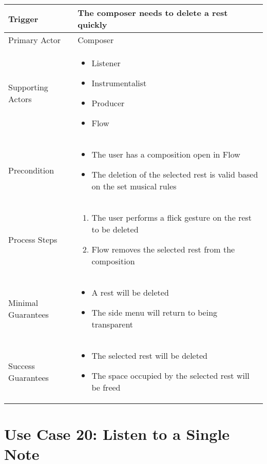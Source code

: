   \begin{tabularx}{\textwidth}{|X|X|}
  \hline
  Trigger & 
  The composer needs to delete a rest quickly \\
  \hline
  Primary Actor & 
  Composer\\
  \hline
  Supporting Actors & 
  \begin{itemize}
  \item Listener
  \item Instrumentalist
  \item Producer
  \item Flow
  \end{itemize} \\
  \hline
  Precondition & 
  \begin{itemize}
  \item The user has a composition open in Flow 
  \item The deletion of the selected rest is valid based on the set musical rules
  \end{itemize} \\
  \hline
  Process Steps & 
  \begin{enumerate}
  \item The user performs a flick gesture on the rest to be deleted
  \item Flow removes the selected rest from the composition
  \end{enumerate} \\
  \hline
  Minimal Guarantees & 
  \begin{itemize}
    \item A rest will be deleted
    \item The side menu will return to being transparent
  \end{itemize} \\
  \hline
  Success Guarantees & 
  \begin{itemize}
    \item The selected rest will be deleted
    \item The space occupied by the selected rest will be freed
  \end{itemize} \\
  \hline
  \end{tabularx}

  \section{Use Case 20: Listen to a Single Note}

